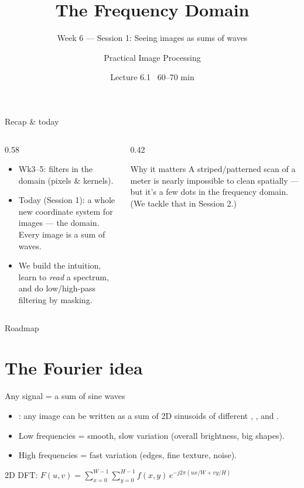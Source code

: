 \documentclass[10pt,aspectratio=169]{beamer}
\title{The Frequency Domain}
\subtitle{Week 6 — Session 1: Seeing images as sums of waves}
\author{Practical Image Processing}
\date{Lecture 6.1 \textbullet\ 60--70 min}
\begin{document}
\maketitle

\begin{frame}{Recap \& today}
  \begin{columns}[T]
    \begin{column}{0.58\textwidth}
      \begin{itemize}
        \item Wk3--5: filters in the  domain (pixels \& kernels).
        \item \alert{Today (Session 1):} a whole new coordinate system for images — the
               domain. Every image is a sum of waves.
        \item We build the intuition, learn to \emph{read} a spectrum, and do low/high-pass
              filtering by masking.
      \end{itemize}
    \end{column}
    \begin{column}{0.42\textwidth}
      \begin{alertblock}{Why it matters}
        A striped/patterned scan of a meter is nearly impossible to clean spatially — but it's
        a few dots in the frequency domain. (We tackle that in Session 2.)
      \end{alertblock}
    \end{column}
  \end{columns}
\end{frame}

\begin{frame}{Roadmap}\tableofcontents\end{frame}

\section{The Fourier idea}

\begin{frame}{Any signal = a sum of sine waves}
  \begin{itemize}
    \item {}: any image can be written as a sum of 2D sinusoids of different
          , , and .
    \item Low frequencies = smooth, slow variation (overall brightness, big shapes).
    \item High frequencies = fast variation (edges, fine texture, noise).
  \end{itemize}
  \begin{mathbox}
    2D DFT: $F(u,v)=\displaystyle\sum_{x=0}^{W-1}\sum_{y=0}^{H-1} f(x,y)\,e^{-j2\pi(ux/W + vy/H)}$
  \end{mathbox}
\end{frame}
\end{document}
